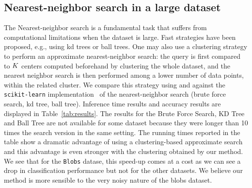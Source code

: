\subsection{Nearest-neighbor search in a large dataset}
The Nearest-neighbor search is a fundamental task that suffers from computational limitations when the dataset is large.
Fast strategies have been proposed, e.g., using kd trees or ball trees.
One may also use a clustering strategy to perform an approximate nearest-neighbor search: the query is first compared to $K$ centers computed beforehand by clustering the whole dataset, and the nearest neighbor search is then performed among a lower number of data points, within the related cluster.
We compare this strategy using \kmeans and \qkmeans against the \texttt{scikit-learn} implementation~\cite{Pedregosa2011Scikit} of the nearest-neighbor search (brute force search, kd tree, ball tree).
Inference time results and accuracy results are displayed in Table~\ref{tab:results}. 
The results for the Brute Force Search, KD Tree and Ball Tree are not available for some dataset because they were longer than 10 times the \kmeans search version in the same setting.
The running times reported in the table show a dramatic advantage of using a clustering-based approximate search 
and this advantage is even stronger with the clustering obtained by our \qkmeans method. We see that for the \texttt{Blobs} datase, this speed-up comes at a cost as we can see a drop in classification performance but not for the other datasets. We believe our method is more sensible to the very noisy nature of the blobs dataset.
% 


